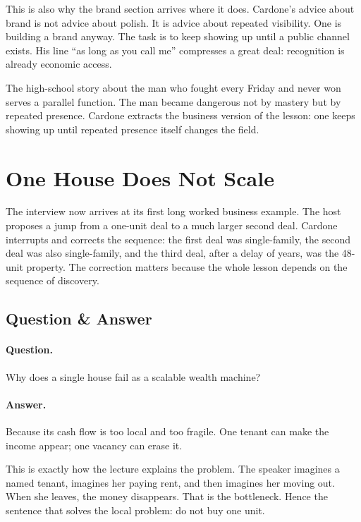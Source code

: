 This is also why the brand section arrives where it does. Cardone's advice about brand is not advice about polish. It is advice about repeated visibility. One is building a brand anyway. The task is to keep showing up until a public channel exists. His line ``as long as you call me'' compresses a great deal: recognition is already economic access.

The high-school story about the man who fought every Friday and never won serves a parallel function. The man became dangerous not by mastery but by repeated presence. Cardone extracts the business version of the lesson: one keeps showing up until repeated presence itself changes the field.

\section{One House Does Not Scale}

The interview now arrives at its first long worked business example. The host proposes a jump from a one-unit deal to a much larger second deal. Cardone interrupts and corrects the sequence: the first deal was single-family, the second deal was also single-family, and the third deal, after a delay of years, was the 48-unit property. The correction matters because the whole lesson depends on the sequence of discovery.

\subsection{Question \& Answer}

\paragraph{Question.}
Why does a single house fail as a scalable wealth machine?

\paragraph{Answer.}
Because its cash flow is too local and too fragile. One tenant can make the income appear; one vacancy can erase it.

This is exactly how the lecture explains the problem. The speaker imagines a named tenant, imagines her paying rent, and then imagines her moving out. When she leaves, the money disappears. That is the bottleneck. Hence the sentence that solves the local problem: do not buy one unit.

